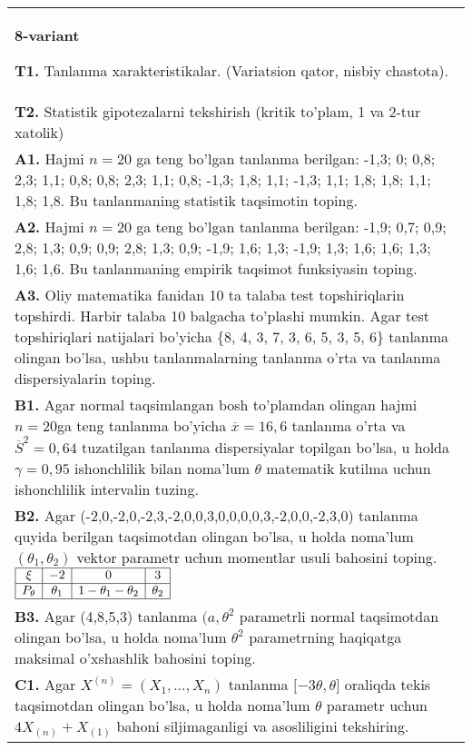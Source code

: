 \documentclass{article}
\begin{document}
\begin{tabular}{m{17cm}}
\textbf{8-variant}
\newline

\textbf{T1.} 
Tanlanma xarakteristikalar. (Variatsion qator, nisbiy chastota).
\\
\textbf{T2.} 
Statistik gipotezalarni tekshirish (kritik to'plam, 1 va 2-tur xatolik)
\\
\textbf{A1.} 
Hajmi \(n = 20\) ga teng bo'lgan tanlanma berilgan: -1,3; 0; 0,8; 2,3; 1,1; 0,8; 0,8; 2,3; 1,1; 0,8; -1,3; 1,8; 1,1; -1,3; 1,1; 1,8; 1,8; 1,1; 1,8; 1,8. Bu tanlanmaning statistik taqsimotin toping.
\\
\textbf{A2.} 
Hajmi \(n = 20\) ga teng bo'lgan tanlanma berilgan: -1,9; 0,7; 0,9; 2,8; 1,3; 0,9; 0,9; 2,8; 1,3; 0,9; -1,9; 1,6; 1,3; -1,9; 1,3; 1,6; 1,6; 1,3; 1,6; 1,6. Bu tanlanmaning empirik taqsimot funksiyasin toping.
\\
\textbf{A3.} 
Oliy matematika fanidan 10 ta talaba test topshiriqlarin topshirdi. Harbir talaba 10 balgacha to'plashi mumkin. Agar test topshiriqlari natijalari bo'yicha \{8, 4, 3, 7, 3, 6, 5, 3, 5, 6\} tanlanma olingan bo'lsa, ushbu tanlanmalarning tanlanma o'rta va tanlanma dispersiyalarin toping.
\\
\textbf{B1.} 
Agar normal taqsimlangan bosh to'plamdan olingan hajmi \(n = 20\)ga teng tanlanma bo'yicha \(\overline{x} = 16,6\) tanlanma o'rta va \({\overline{S}}^{2} = 0,64\) tuzatilgan tanlanma dispersiyalar topilgan bo'lsa, u holda \(\gamma = 0,95\) ishonchlilik bilan noma'lum \(\theta\) matematik kutilma uchun ishonchlilik intervalin tuzing.
\\
\textbf{B2.} 
Agar (-2,0,-2,0,-2,3,-2,0,0,3,0,0,0,0,3,-2,0,0,-2,3,0) tanlanma quyida berilgan taqsimotdan olingan bo'lsa, u holda noma'lum \(\left( \theta_{1},\theta_{2} \right)\) vektor parametr uchun momentlar usuli bahosini toping.
$\begin{array}{|c|c|c|c|}
    \hline
    \xi & - 2 & 0 & 3\\
    \hline
    P_{\theta} & \theta_{1} & 1 - \theta_{1} - \theta_{2} & \theta_{2} \\
    \hline
\end{array}$
\\
\textbf{B3.} 
Agar (4,8,5,3) tanlanma \((a,\theta^{2}\) parametrli normal taqsimotdan olingan bo'lsa, u holda noma'lum \(\theta^{2}\) parametrning haqiqatga maksimal o'xshashlik bahosini toping.
\\
\textbf{C1.} 
Agar \(X^{(n)} = \left( X_{1},...,X_{n} \right)\) tanlanma \(\lbrack - 3\theta,\theta\rbrack\) oraliqda tekis taqsimotdan olingan bo'lsa, u holda noma'lum \(\theta\) parametr uchun \(4X_{(n)} + X_{(1)}\) bahoni siljimaganligi va asosliligini tekshiring.

\end{tabular}
\end{document}
